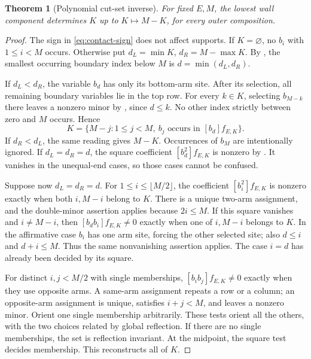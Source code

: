 \documentclass[11pt,a4paper]{amsart}
\numberwithin{equation}{section}
\theoremstyle{plain}
\newtheorem{theorem}{Theorem}[section]
\theoremstyle{definition}
\begin{document}
\begin{theorem}[Polynomial cut-set inverse]\label{thm:cut-set-inverse}
For fixed \(E,M\), the lowest wall component determines \(K\) up to \(K\mapsto M-K\), for every outer composition.
\end{theorem}
\begin{proof}
The sign in \eqref{eq:contact-sign} does not affect supports.  If \(K=\varnothing\), no \(b_i\) with \(1\le i<M\) occurs.  Otherwise put \(d_L=\min K\), \(d_R=M-\max K\).  By , the smallest occurring boundary index below \(M\) is \(d=\min(d_L,d_R)\).

If \(d_L<d_R\), the variable \(b_d\) has only its bottom-arm site.  After its selection, all remaining boundary variables lie in the top row.  For every \(k\in K\), selecting \(b_{M-k}\) there leaves a nonzero minor by , since \(d\le k\).  No other index strictly between zero and \(M\) occurs.  Hence
\begin{equation}\label{eq:unequal-arm-decoder}
 K=\{M-j:1\le j<M,\ b_j\text{ occurs in }[b_d]f_{E,K}\}.
\end{equation}
If \(d_R<d_L\), the same reading gives \(M-K\).  Occurrences of \(b_M\) are intentionally ignored.  If \(d_L=d_R=d\), the square coefficient \([b_d^2]f_{E,K}\) is nonzero by .  It vanishes in the unequal-end cases, so those cases cannot be confused.

Suppose now \(d_L=d_R=d\).  For \(1\le i\le\lfloor M/2\rfloor\), the coefficient \([b_i^2]f_{E,K}\) is nonzero exactly when both \(i,M-i\) belong to \(K\).  There is a unique two-arm assignment, and the double-minor assertion applies because \(2i\le M\).  If this square vanishes and \(i\ne M-i\), then \([b_db_i]f_{E,K}\ne0\) exactly when one of \(i,M-i\) belongs to \(K\).  In the affirmative case \(b_i\) has one arm site, forcing the other selected site; also \(d\le i\) and \(d+i\le M\).  Thus the same nonvanishing assertion applies.  The case \(i=d\) has already been decided by its square.

For distinct \(i,j<M/2\) with single memberships, \([b_ib_j]f_{E,K}\ne0\) exactly when they use opposite arms.  A same-arm assignment repeats a row or a column; an opposite-arm assignment is unique, satisfies \(i+j<M\), and leaves a nonzero minor.  Orient one single membership arbitrarily.  These tests orient all the others, with the two choices related by global reflection.  If there are no single memberships, the set is reflection invariant.  At the midpoint, the square test decides membership.  This reconstructs all of \(K\).
\end{proof}
\end{document}
